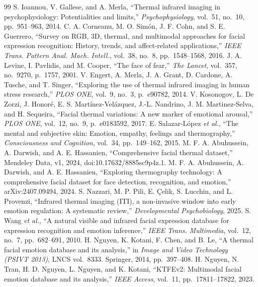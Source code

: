 \documentclass[10pt,twocolumn,letterpaper]{article}
\begin{document}
\footnotesize
\begin{thebibliography}{99}
\setlength{\itemsep}{0pt}
 S. Ioannou, V. Gallese, and A. Merla, ``Thermal infrared imaging in psychophysiology: Potentialities and limits,'' \emph{Psychophysiology}, vol.~51, no.~10, pp.~951--963, 2014.
 C. A. Corneanu, M. O. Simón, J. F. Cohn, and S. E. Guerrero, ``Survey on RGB, 3D, thermal, and multimodal approaches for facial expression recognition: History, trends, and affect-related applications,'' \emph{IEEE Trans. Pattern Anal. Mach. Intell.}, vol.~38, no.~8, pp.~1548--1568, 2016.
 J. A. Levine, I. Pavlidis, and M. Cooper, ``The face of fear,'' \emph{The Lancet}, vol.~357, no.~9270, p.~1757, 2001.
 V. Engert, A. Merla, J. A. Grant, D. Cardone, A. Tusche, and T. Singer, ``Exploring the use of thermal infrared imaging in human stress research,'' \emph{PLOS ONE}, vol.~9, no.~3, p.~e90782, 2014.
 V. Kosonogov, L. De Zorzi, J. Honoré, E. S. Martínez-Velázquez, J.-L. Nandrino, J. M. Martinez-Selva, and H. Sequeira, ``Facial thermal variations: A new marker of emotional arousal,'' \emph{PLOS ONE}, vol.~12, no.~9, p.~e0183592, 2017.
 E. Salazar-López \emph{et al.}, ``The mental and subjective skin: Emotion, empathy, feelings and thermography,'' \emph{Consciousness and Cognition}, vol.~34, pp.~149--162, 2015.
 M. F. A. Abuhussein, A. Darwish, and A. E. Hassanien, ``Comprehensive facial thermal dataset,'' Mendeley Data, v1, 2024, doi:10.17632/8885sc9p4z.1.
 M. F. A. Abuhussein, A. Darwish, and A. E. Hassanien, ``Exploring thermography technology: A comprehensive facial dataset for face detection, recognition, and emotion,'' arXiv:2407.09494, 2024.
 S. Nazzari, M. P. Pili, E. Çelik, S. Lucchin, and L. Provenzi, ``Infrared thermal imaging (ITI), a non-invasive window into early emotion regulation: A systematic review,'' \emph{Developmental Psychobiology}, 2025.
 S. Wang \emph{et al.}, ``A natural visible and infrared facial expression database for expression recognition and emotion inference,'' \emph{IEEE Trans. Multimedia}, vol.~12, no.~7, pp.~682--691, 2010.
 H. Nguyen, K. Kotani, F. Chen, and B. Le, ``A thermal facial emotion database and its analysis,'' in \emph{Image and Video Technology (PSIVT 2013)}, LNCS vol.~8333. Springer, 2014, pp.~397--408.
 H. Nguyen, N. Tran, H. D. Nguyen, L. Nguyen, and K. Kotani, ``KTFEv2: Multimodal facial emotion database and its analysis,'' \emph{IEEE Access}, vol.~11, pp.~17811--17822, 2023.

\end{thebibliography}
\end{document}
